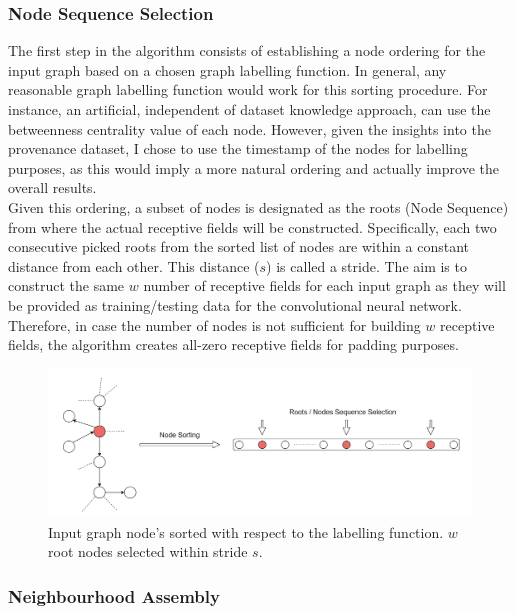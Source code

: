 \subsubsection*{Node Sequence Selection} \label{node_seq_sel}

The first step in the algorithm consists of establishing a node ordering for the input graph based on a chosen graph labelling function. In general, any reasonable graph labelling function would work for this sorting procedure. For instance, an artificial, independent of dataset knowledge approach, can use the betweenness centrality value of each node. However, given the insights into the provenance dataset, I chose to use the timestamp of the nodes for labelling purposes, as this would imply a more natural ordering and actually improve the overall results. \\

Given this ordering, a subset of nodes is designated as the roots (Node Sequence) from where the actual receptive fields will be constructed. Specifically, each two consecutive picked roots from the sorted list of nodes are within a constant distance from each other. This distance ($s$) is called a stride. The aim is to construct the same $w$ number of receptive fields for each input graph as they will be provided as training/testing data for the convolutional neural network. Therefore, in case the number of nodes is not sufficient for building $w$ receptive fields, the algorithm creates all-zero receptive fields for padding purposes. \\

\begin{figure}[H]
  \centering
  \includegraphics[scale=0.4]{Images/nodeseqsel.png}
  \caption{Input graph node's sorted with respect to the labelling function. $w$ root nodes selected within stride $s$.}
  \label{nodeseqsel}
\end{figure}

\subsubsection*{Neighbourhood Assembly}

